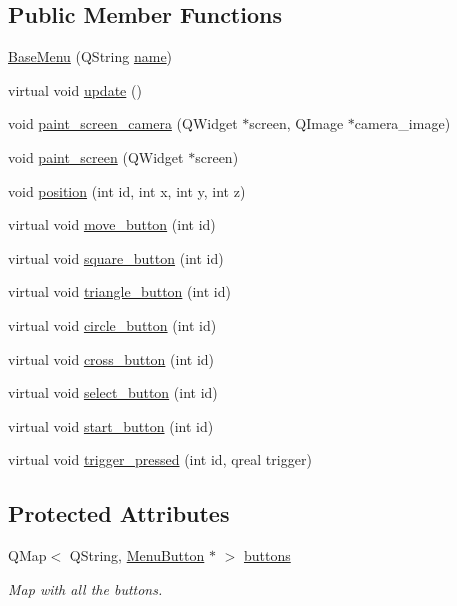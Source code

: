 \subsection*{Public Member Functions}
\begin{DoxyCompactItemize}
\item 
\hyperlink{class_base_menu_aea2baf1bc987227878fd914d19fe3a14}{Base\-Menu} (Q\-String \hyperlink{class_game_state_ab30c2bb30e4236231ae97976576c130a}{name})
\item 
virtual void \hyperlink{class_base_menu_a4679a8f7c2872606910baa1b08fe0ba1}{update} ()
\item 
void \hyperlink{class_base_menu_ad75153fdfff53b0421beb9674c0237e3}{paint\-\_\-screen\-\_\-camera} (Q\-Widget $\ast$screen, Q\-Image $\ast$camera\-\_\-image)
\item 
void \hyperlink{class_base_menu_ae45dccc7c3b8da62b4cd0d5b6c211a12}{paint\-\_\-screen} (Q\-Widget $\ast$screen)
\item 
void \hyperlink{class_base_menu_a9c2bc1403e96c1bd411883a47e47155b}{position} (int id, int x, int y, int z)
\item 
virtual void \hyperlink{class_base_menu_a72bee3689ae1f2e4f92fc0dfa0fdffcf}{move\-\_\-button} (int id)
\item 
virtual void \hyperlink{class_base_menu_ae19bd0ebccab280b44893e07c6d5c3d1}{square\-\_\-button} (int id)
\item 
virtual void \hyperlink{class_base_menu_a02c70880683c8f77490d52ce5703c4e6}{triangle\-\_\-button} (int id)
\item 
virtual void \hyperlink{class_base_menu_a0292d1dcfc61b624b22ef0ac6bfddeda}{circle\-\_\-button} (int id)
\item 
virtual void \hyperlink{class_base_menu_a809fbcd446fd3a4ac69dd9dfd696b9a9}{cross\-\_\-button} (int id)
\item 
virtual void \hyperlink{class_base_menu_a841913080aca368285ac14e903a9972a}{select\-\_\-button} (int id)
\item 
virtual void \hyperlink{class_base_menu_a8bb01ae970bb9376fe6a620169e193b3}{start\-\_\-button} (int id)
\item 
virtual void \hyperlink{class_base_menu_adb277f30427d5811f86f8699b04c4abe}{trigger\-\_\-pressed} (int id, qreal trigger)
\end{DoxyCompactItemize}
\subsection*{Protected Attributes}
\begin{DoxyCompactItemize}
\item 
\hypertarget{class_base_menu_ab488e57ffca40b039cfebb4d544f1357}{Q\-Map$<$ Q\-String, \hyperlink{class_menu_button}{Menu\-Button} $\ast$ $>$ \hyperlink{class_base_menu_ab488e57ffca40b039cfebb4d544f1357}{buttons}}\label{class_base_menu_ab488e57ffca40b039cfebb4d544f1357}

\begin{DoxyCompactList}\small\item\em Map with all the buttons. \end{DoxyCompactList}\end{DoxyCompactItemize}
